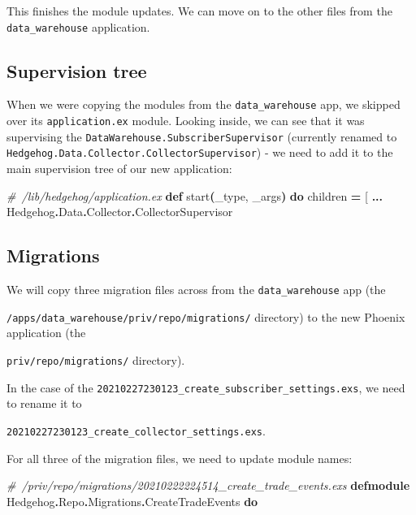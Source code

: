 \documentclass[
  oneside]{book}
\newenvironment{Shaded}{\begin{snugshade}}{\end{snugshade}}
\newcommand{\CommentTok}[1]{\textcolor[rgb]{0.56,0.35,0.01}{\textit{#1}}}
\newcommand{\ConstantTok}[1]{\textcolor[rgb]{0.56,0.35,0.01}{#1}}
\newcommand{\FunctionTok}[1]{\textcolor[rgb]{0.13,0.29,0.53}{\textbf{#1}}}
\newcommand{\KeywordTok}[1]{\textcolor[rgb]{0.13,0.29,0.53}{\textbf{#1}}}
\newcommand{\NormalTok}[1]{#1}
\newcommand{\OperatorTok}[1]{\textcolor[rgb]{0.81,0.36,0.00}{\textbf{#1}}}
\newcommand{\OtherTok}[1]{\textcolor[rgb]{0.56,0.35,0.01}{#1}}
\begin{document}
This finishes the module updates. We can move on to the other files from the \texttt{data\_warehouse} application.

\subsection{Supervision tree}\label{supervision-tree}

When we were copying the modules from the \texttt{data\_warehouse} app, we skipped over its \texttt{application.ex} module. Looking inside, we can see that it was supervising the \texttt{DataWarehouse.SubscriberSupervisor} (currently renamed to \texttt{Hedgehog.Data.Collector.CollectorSupervisor}) - we need to add it to the main supervision tree of our new application:

\begin{Shaded}
\begin{Highlighting}[]
\CommentTok{\# /lib/hedgehog/application.ex}
  \KeywordTok{def}\NormalTok{ start}\FunctionTok{(}\NormalTok{\_type, \_args}\FunctionTok{)} \KeywordTok{do}
\NormalTok{    children }\OperatorTok{=} \OtherTok{[}
      \OperatorTok{...}
      \ConstantTok{Hedgehog}\OperatorTok{.}\ConstantTok{Data}\OperatorTok{.}\ConstantTok{Collector}\OperatorTok{.}\ConstantTok{CollectorSupervisor}
\end{Highlighting}
\end{Shaded}

\subsection{Migrations}\label{migrations}

We will copy three migration files across from the \texttt{data\_warehouse} app (the

\texttt{/apps/data\_warehouse/priv/repo/migrations/} directory) to the new Phoenix application (the

\texttt{priv/repo/migrations/} directory).

In the case of the \texttt{20210227230123\_create\_subscriber\_settings.exs}, we need to rename it to

\texttt{20210227230123\_create\_collector\_settings.exs}.

For all three of the migration files, we need to update module names:

\begin{Shaded}
\begin{Highlighting}[]
\CommentTok{\# /priv/repo/migrations/20210222224514\_create\_trade\_events.exs}
\KeywordTok{defmodule} \ConstantTok{Hedgehog}\OperatorTok{.}\ConstantTok{Repo}\OperatorTok{.}\ConstantTok{Migrations}\OperatorTok{.}\ConstantTok{CreateTradeEvents} \KeywordTok{do}
\end{Highlighting}
\end{Shaded}
\end{document}
